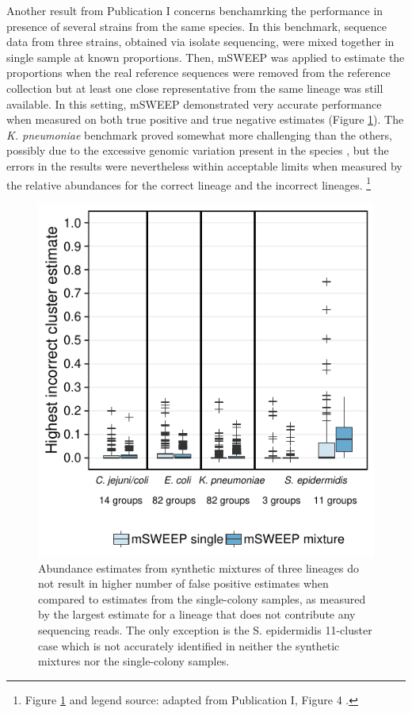 \documentclass[officiallayout]{tktla}
\let\svthefootnote\thefootnote
\begin{document}
Another result from Publication I concerns benchamrking the
performance in presence of several strains from the same species. In
this benchmark, sequence data from three strains, obtained via isolate
sequencing, were mixed together in single sample at known
proportions. Then, mSWEEP was applied to estimate the proportions when
the real reference sequences were removed from the reference
collection but at least one close representative from the same lineage
was still available. In this setting, mSWEEP demonstrated very
accurate performance when measured on both true positive and true
negative estimates (Figure \ref{fig:msweep-synthetic-mixtures}). The \textit{K. pneumoniae} benchmark proved
somewhat more challenging than the others, possibly due to the
excessive genomic variation present in the species
\citep{wyres2016klebsiella}, but the errors in the results were
nevertheless within acceptable limits when measured by the relative
abundances for the correct lineage and the incorrect lineages.
\noindent\let\thefootnote\relax\footnote{Figure \ref{fig:msweep-synthetic-mixtures} and legend source: adapted from Publication I, Figure 4 \citep{maklin_high-resolution_2021}.}
\addtocounter{footnote}{-1}\let\thefootnote\svthefootnote
\begin{figure}[!ht]
    \centering
    \includegraphics[height=0.33\textheight,width=\textwidth,keepaspectratio]{img/reproduced/WOR2021_mSWEEP_Figure_4.pdf}
    \caption{Abundance estimates from synthetic mixtures of three
      lineages do not result in higher number of false positive
      estimates when compared to estimates from the single-colony
      samples, as measured by the largest estimate for a lineage that
      does not contribute any sequencing reads. The only exception is
      the S. epidermidis 11-cluster case which is not accurately
      identified in neither the synthetic mixtures nor the
      single-colony samples.}
  \label{fig:msweep-synthetic-mixtures}
\end{figure}
\end{document}
